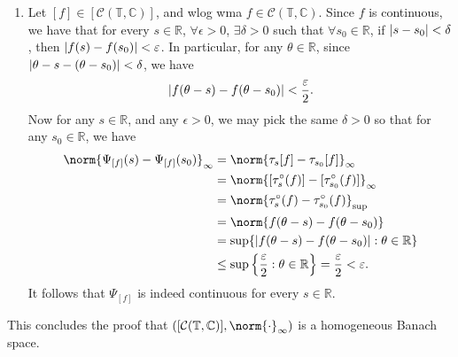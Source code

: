 \documentclass[notoc,notitlepage]{tufte-book}
\begin{document}
\begin{eg}
\begin{enumerate}
    \item Let $[f] \in [\mathcal{C}(\mathbb{T}, \mathbb{C})]$, and wlog wma
      $f \in \mathcal{C}(\mathbb{T}, \mathbb{C})$.
      Since $f$ is continuous, we have that for every $s \in \mathbb{R}$,
      $\forall \epsilon > 0$, $\exists \delta > 0$ such that
      $\forall s_0 \in \mathbb{R}$, if $\left|s - s_0\right| < \delta$,
      then $\left|f(s) - f(s_0)\right| < \varepsilon$.
      In particular, for any $\theta \in \mathbb{R}$, since
      $\left|\theta - s - (\theta - s_0)\right| < \delta$, we have
      \begin{equation*}
        \left|f(\theta - s) - f(\theta - s_0)\right| < \frac{\varepsilon}{2}.
      \end{equation*}
      Now for any $s \in \mathbb{R}$, and any $\epsilon > 0$,
      we may pick the same $\delta > 0$ so that for any $s_0 \in \mathbb{R}$,
      we have
      \begin{align*}
        \norm{\Psi_{[f]}(s) - \Psi_{[f]}(s_0)}_{\infty}
        &= \norm{\tau_s[f] - \tau_{s_0}[f]}_{\infty} \\
        &= \norm{[\tau_s^{\circ}(f)] - [\tau_{s_0}^{\circ}(f)]}_{\infty} \\
        &= \norm{\tau_s^{\circ}(f) - \tau_{s_0}^{\circ}(f)}_{\sup} \\
        &= \norm{f(\theta - s) - f(\theta - s_0)} \\
        &= \sup \{ \abs{f(\theta - s) - f(\theta - s_0)} : \theta \in \mathbb{R} \} \\
        &\leq \sup \left\{ \frac{\epsilon}{2} : \theta \in \mathbb{R} \right\}
        = \frac{\epsilon}{2} < \epsilon.
      \end{align*}
      It follows that $\Psi_{[f]}$ is indeed continuous
      for every $s \in \mathbb{R}$.
  \end{enumerate}
  This concludes the proof that
  $( [\mathcal{C}(\mathbb{T}, \mathbb{C})], \norm{\cdot}_{\infty} )$
  is a homogeneous Banach space.
\end{eg}
\end{document}
